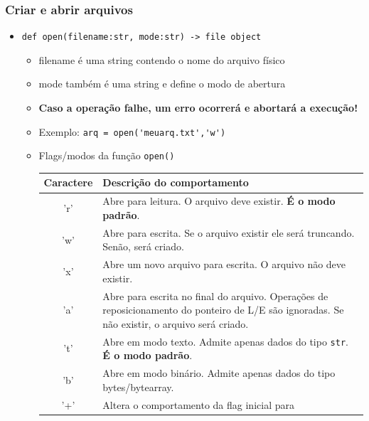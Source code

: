 \documentclass[12pt]{article}
\begin{document}
        \subsubsection{Criar e abrir arquivos}
        \begin{itemize}
            \item \verb|def open(filename:str, mode:str) -> file object|
            \begin{itemize}
                \item filename é uma string contendo o nome do arquivo físico
                \item mode também é uma string e define o modo de abertura
                \item \textbf{Caso a operação falhe, um erro ocorrerá e abortará 
                a execução!}
                \item Exemplo: \verb|arq = open('meuarq.txt','w')|
                \item Flags/modos da função \verb|open()|
                \begin{table}[H]
                    \centering
                    \begin{tabular}{|c| p{10cm}|}
                        \hline
                        Caractere & Descrição do comportamento \\ \hline
                        'r' & Abre para leitura. O arquivo deve existir. 
                        \textbf{É o modo padrão}. \\ \hline
                        'w' & Abre para escrita. Se o arquivo existir ele será 
                        truncando. Senão, será criado. \\ \hline
                        'x' & Abre um novo arquivo para escrita. O arquivo não 
                        deve existir. \\ \hline
                        'a' & Abre para escrita no final do arquivo. Operações 
                        de reposicionamento do ponteiro de L/E são ignoradas. 
                        Se não existir, o arquivo será criado. \\ \hline
                        't' & Abre em modo texto. Admite apenas dados do tipo 
                        \verb|str|. \textbf{É o modo padrão}. \\ \hline
                        'b' & Abre em modo binário. Admite apenas dados do tipo 
                        bytes/bytearray. \\ \hline
                        '+' & Altera o comportamento da flag inicial para 

\end{tabular}
\end{table}
\end{itemize}
\end{itemize}
\end{document}
